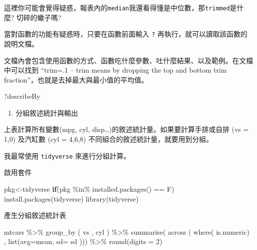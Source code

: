 \documentclass[
]{book}
\newenvironment{Shaded}{\begin{snugshade}}{\end{snugshade}}
\newcommand{\AttributeTok}[1]{\textcolor[rgb]{0.77,0.63,0.00}{#1}}
\newcommand{\ControlFlowTok}[1]{\textcolor[rgb]{0.13,0.29,0.53}{\textbf{#1}}}
\newcommand{\DecValTok}[1]{\textcolor[rgb]{0.00,0.00,0.81}{#1}}
\newcommand{\FunctionTok}[1]{\textcolor[rgb]{0.00,0.00,0.00}{#1}}
\newcommand{\NormalTok}[1]{#1}
\newcommand{\OtherTok}[1]{\textcolor[rgb]{0.56,0.35,0.01}{#1}}
\newcommand{\SpecialCharTok}[1]{\textcolor[rgb]{0.00,0.00,0.00}{#1}}
\newcommand{\StringTok}[1]{\textcolor[rgb]{0.31,0.60,0.02}{#1}}
\providecommand{\tightlist}{%
  \setlength{\itemsep}{0pt}\setlength{\parskip}{0pt}}
\begin{document}
這裡你可能會覺得疑惑，報表內的\texttt{median}我還看得懂是中位數，那\texttt{trimmed}是什麼? 切碎的蠍子嗎?

當對函數的功能有疑惑時，只要在函數前面輸入 \texttt{?} 再執行，就可以讀取該函數的說明文檔。

文檔內會包含使用函數的方式、函數吃什麼參數、吐什麼結果、以及範例。在文檔中可以找到 ``trim=.1 -- trim means by dropping the top and bottom trim fraction''，也就是去掉最大與最小值的平均值。

\begin{Shaded}
\begin{Highlighting}[]
\NormalTok{?describeBy}
\end{Highlighting}
\end{Shaded}

\begin{enumerate}
\def\labelenumi{\arabic{enumi}.}
\setcounter{enumi}{2}
\tightlist
\item
  分組敘述統計與輸出
\end{enumerate}

上表計算所有變數(mpg, cyl, disp\ldots)的敘述統計量。如果要計算手排或自排 (vs = 1,0) 及汽缸數 (cyl = 4,6,8) 不同組合的敘述統計量，就要用到分組。

我最常使用 \texttt{tidyverse} 來進行分組計算。

啟用套件

\begin{Shaded}
\begin{Highlighting}[]
\NormalTok{pkg}\OtherTok{\textless{}{-}}\StringTok{\textquotesingle{}tidyverse\textquotesingle{}}
\ControlFlowTok{if}\NormalTok{(pkg }\SpecialCharTok{\%in\%} \FunctionTok{installed.packages}\NormalTok{() }\SpecialCharTok{==}\NormalTok{ F) }\FunctionTok{install.packages}\NormalTok{(}\StringTok{\textquotesingle{}tidyverse\textquotesingle{}}\NormalTok{)}
\FunctionTok{library}\NormalTok{(tidyverse)}
\end{Highlighting}
\end{Shaded}

產生分組敘述統計表

\begin{Shaded}
\begin{Highlighting}[]
\NormalTok{mtcars }\SpecialCharTok{\%\textgreater{}\%} 
  \FunctionTok{group\_by}\NormalTok{ ( vs , cyl ) }\SpecialCharTok{\%\textgreater{}\%} 
  \FunctionTok{summarise}\NormalTok{( }\FunctionTok{across}\NormalTok{ ( }\FunctionTok{where}\NormalTok{( is.numeric) , }\FunctionTok{list}\NormalTok{(}\StringTok{\textquotesingle{}avg\textquotesingle{}}\OtherTok{=}\NormalTok{mean, }\StringTok{\textquotesingle{}sd\textquotesingle{}}\OtherTok{=}\NormalTok{ sd ))) }\SpecialCharTok{\%\textgreater{}\%} 
  \FunctionTok{round}\NormalTok{(}\AttributeTok{digits =} \DecValTok{2}\NormalTok{)}
\end{Highlighting}
\end{Shaded}
\end{document}
